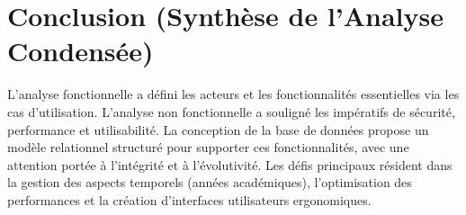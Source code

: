 \section{Conclusion (Synthèse de l'Analyse Condensée)}
L'analyse fonctionnelle a défini les acteurs et les fonctionnalités essentielles via les cas d'utilisation. L'analyse non fonctionnelle a souligné les impératifs de sécurité, performance et utilisabilité. La conception de la base de données propose un modèle relationnel structuré pour supporter ces fonctionnalités, avec une attention portée à l'intégrité et à l'évolutivité.
Les défis principaux résident dans la gestion des aspects temporels (années académiques), l'optimisation des performances et la création d'interfaces utilisateurs ergonomiques.
